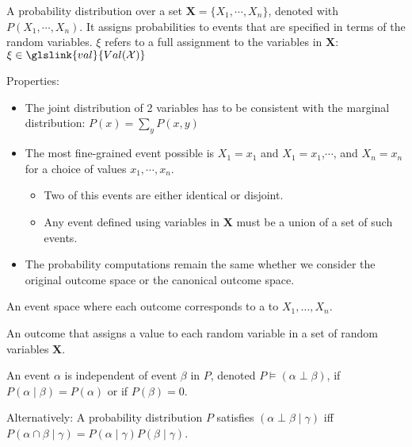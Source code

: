 {%
  A \gls{probability distribution} over a set $\bm{X}=\{X_1,\cdots,X_n\}$, denoted with $P(X_1,\cdots,X_n)$. It assigns probabilities to events that are specified in terms of the \glspl{random variable}. $\xi$ refers to a full assignment to the variables in $\bm{X}$: $\xi\in\glslink{val}{Val(\mathcal{X})}$

  Properties:
  \begin{itemize}
    \item The joint distribution of 2 variables has to be consistent with the \gls{marginal distribution}: $P(x)=\sum_{y}P(x,y)$
    \item The most fine-grained event possible is $X_1=x_1$ and $X_1=x_1$,$\cdots$, and $X_n=x_n$ for a choice of values $x_1,\cdots,x_n$.
    \begin{itemize}
      \item Two of this events are either identical or disjoint.
      \item Any event defined using variables in $\bm{X}$ must be a union of a set of such events.
    \end{itemize}
    \item The probability computations remain the same whether we consider the original outcome space or the \gls{canonical outcome space}.
  \end{itemize}

}

{%
  An \gls{event space} where each outcome corresponds to a  to $X_1,\dots, X_n$.
}

{%
  An outcome that assigns a value to each \gls{random variable} in a set of random variables $\bm{X}$.
}

{%
  An event $\alpha$ is independent of event $\beta$ in $P$, denoted $P\models(\alpha\perp\beta)$, if $P(\alpha\mid\beta)=P(\alpha)$ or if $P(\beta)=0$.

  Alternatively: A \gls{probability distribution} $P$ satisfies $(\alpha\perp\beta\mid\gamma)$ \acrshort{iff} $P(\alpha\cap\beta\mid\gamma)=P(\alpha\mid\gamma)P(\beta\mid\gamma)$.
}

